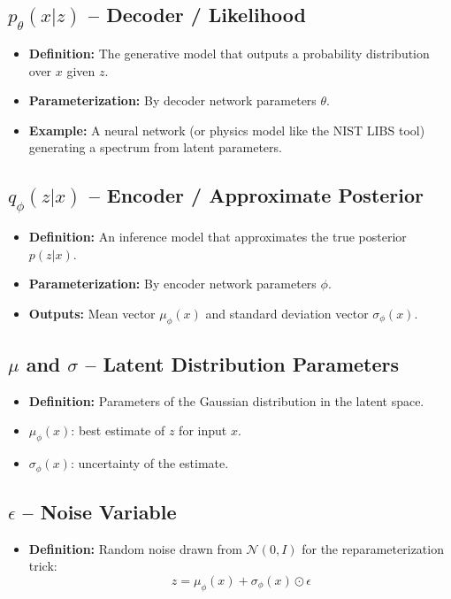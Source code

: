 \documentclass[12pt,a4paper]{article}
\begin{document}
	\subsection{\( p_\theta(x|z) \) -- Decoder / Likelihood}
	\begin{itemize}
		\item \textbf{Definition:} The generative model that outputs a probability distribution over \( x \) given \( z \).
		\item \textbf{Parameterization:} By decoder network parameters \( \theta \).
		\item \textbf{Example:} A neural network (or physics model like the NIST LIBS tool) generating a spectrum from latent parameters.
	\end{itemize}
	
	\subsection{\( q_\phi(z|x) \) -- Encoder / Approximate Posterior}
	\begin{itemize}
		\item \textbf{Definition:} An inference model that approximates the true posterior \( p(z|x) \).
		\item \textbf{Parameterization:} By encoder network parameters \( \phi \).
		\item \textbf{Outputs:} Mean vector \( \mu_\phi(x) \) and standard deviation vector \( \sigma_\phi(x) \).
	\end{itemize}
	
	\subsection{\( \mu \) and \( \sigma \) -- Latent Distribution Parameters}
	\begin{itemize}
		\item \textbf{Definition:} Parameters of the Gaussian distribution in the latent space.
		\item \( \mu_\phi(x) \): best estimate of \( z \) for input \( x \).
		\item \( \sigma_\phi(x) \): uncertainty of the estimate.
	\end{itemize}
	
	\subsection{\( \epsilon \) -- Noise Variable}
	\begin{itemize}
		\item \textbf{Definition:} Random noise drawn from \( \mathcal{N}(0, I) \) for the reparameterization trick:
		\[
		z = \mu_\phi(x) + \sigma_\phi(x) \odot \epsilon
		\]
	\end{itemize}
	
\end{document}
